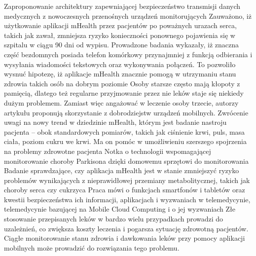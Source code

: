\cite{SSahoo2012EfficientSecurityMechanismsformHealthApplicationsUsingWirelessBodySensorNetworks} Zaproponowanie architektury zapewniającej bezpieczeństwo transmisji danych medycznych z nowoczesnych przenośnych urządzeń monitorujących
\cite{FMottl2014Smartphoneappprovesvaluableforcardiacpatients} Zauważono, iż użytkowanie aplikacji mHealth przez pacjentów po poważnych urazach serca, takich jak zawał, zmniejsza ryzyko konieczności ponownego pojawienia się w szpitalu w ciągu 90 dni od wypisu.
\cite{FSlabodkin2013HomelesspatientsmaybenefitfrommHealth} Prowadzone badania wykazały, iż znaczna część bezdomnych posiada telefon komórkowy przynajmniej z funkcją odbierania i wysyłania wiadomości tekstowych oraz wykonywania połączeń. To pozwoliło wysnuć hipotezę, iż aplikacje mHealth znacznie pomogą w utrzymaniu stanu zdrowia takich osób na dobrym poziomie
\cite{FBartley2014mHealthapphelpselderlypatientswithmedicalindependenceAndroidiOSmedicaldevicesmHealthMobileapplicationsTablets} Osoby starsze często mają kłopoty z pamięcią, dlatego też regularne przyjmowanie przez nie leków staje się niekiedy dużym problemem. Zamiast więc angażować w leczenie osoby trzecie, autorzy artykułu proponują skorzystanie z dobrodziejstw urządzeń mobilnych.
\cite{FSlabodkin2013Kvedar:MobilemoodtrackersarepromisingmHealthtrend} Zwrócenie uwagi na nowy trend w dziedzinie mHealth, którym jest badanie nastroju pacjenta – obok standardowych pomiarów, takich jak ciśnienie krwi, puls, masa ciała, poziom cukru we krwi. Ma on pomóc w umożliwieniu szerszego spojrzenia na problemy zdrowotne pacjenta
\cite{BMacKellar2014AussiemhealthfirmtorollouttoolforParkinsons} Notka o technologii wspomagającej monitorowanie choroby Parkisona dzięki domowemu sprzętowi do monitorowania
\cite{BPHPetrella2014Mobilehealthexerciseandmetabolicrisk:arandomizedcontrolledtrialMetabolicdisordersOlderpeopleMedicalresearchCholesterol} Badanie sprawdzające, czy aplikacja mHealth jest w stanie zmniejszyć ryzyko problemów wynikających z nieprawidłowej przemiany metabolitycznej, takich jak choroby serca czy cukrzyca
\cite{IJoCCaSSWang2014TelemedicineBasedonMobileDevicesandMobileCloudComputing} Praca mówi o funkcjach smartfonów i tabletów oraz kwestii bezpieczeństwa ich informacji, aplikacjach i wyzwaniach w telemedycynie, telemedycynie bazującej na Mobile Cloud Computing i o jej wyzwaniach
\cite{ISoMAHN&CVarshney2014Mobilehealth:medicationabuseandaddictionaddictionmobilehealthmonitoringprescriptionabuse} Złe stosowanie przepisanych leków w bardzo wielu przypadkach prowadzi do uzależnień, co zwiększa koszty leczenia i pogarsza sytuację zdrowotną pacjentów. Ciągłe monitorowanie stanu zdrowia i dawkowania leków przy pomocy aplikacji mobilnych może prowadzić do rozwiązania tego problemu.
